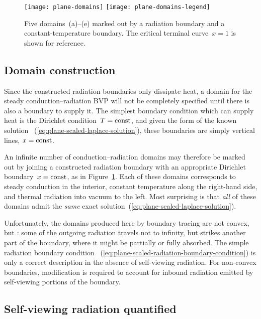\begin{figure}
  \centering
  \texttt{[image: plane-domains]}
  \texttt{[image: plane-domains-legend]}
  \caption{
    Five domains~(a)--(e) marked out by a radiation boundary
    and a constant-temperature boundary.
    The critical terminal curve~$x = 1$ is shown for reference.
  }
  \label{fig:plane-domains}
\end{figure}

\subsection{Domain construction}
\label{sec:cartesian.plane.domain}

Since the constructed radiation boundaries only dissipate heat,
a domain for the steady conduction--radiation BVP
will not be completely specified
until there is also a boundary to supply it.
The simplest boundary condition which can supply heat
is the Dirichlet condition~$T = \mathrm{const}$,
and given the form of the known solution~%
  (\ref{eq:plane-scaled-laplace-solution}),
these boundaries are simply vertical lines, $x = \mathrm{const}$.

An infinite number of conduction--radiation domains
may therefore be marked out
by joining a constructed radiation boundary
with an appropriate Dirichlet boundary~$x = \mathrm{const}$,
as in Figure~\ref{fig:plane-domains}.
Each of these domains corresponds to steady conduction in the interior,
constant temperature along the right-hand side,
and thermal radiation into vacuum to the left.
Most surprising is that \emph{all} of these domains
admit the \emph{same} exact solution~(\ref{eq:plane-scaled-laplace-solution}).

Unfortunately,
the domains produced here by boundary tracing are not convex,
but :
some of the outgoing radiation travels not to infinity,
but strikes another part of the boundary,
where it might be partially or fully absorbed.
The simple radiation boundary condition~%
  (\ref{eq:plane-scaled-radiation-boundary-condition})
is only a correct description in the absence of self-viewing radiation.
For non-convex boundaries,
modification is required to account for inbound radiation
emitted by self-viewing portions of the boundary.

\subsection{Self-viewing radiation quantified}
\label{sec:cartesian.plane.self-viewing}

